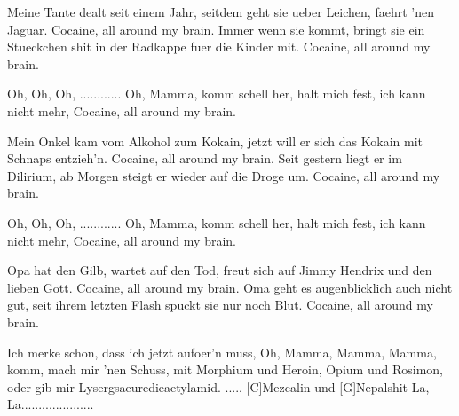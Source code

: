 \begin{guitar}
Meine Tante dealt seit einem Jahr,
seitdem geht sie ueber Leichen, faehrt  'nen Jaguar.
Cocaine, all around my brain.
Immer wenn sie kommt, bringt sie ein Stueckchen shit
in der Radkappe fuer die Kinder mit.
Cocaine, all around my brain.



Oh,   Oh,    Oh, ............ Oh,  Mamma, komm schell her,
halt mich fest, ich kann nicht mehr,
Cocaine, all around my brain.



\pagebreak
Mein Onkel kam vom Alkohol zum Kokain,
jetzt will er sich das Kokain mit Schnaps entzieh'n.
Cocaine, all around my brain.
Seit gestern liegt er im Dilirium,
ab Morgen steigt er wieder auf die Droge um.
Cocaine, all around my brain.



Oh,   Oh,    Oh, ............ Oh,  Mamma, komm schell her,
halt mich fest, ich kann nicht mehr,
Cocaine, all around my brain.



Opa hat den Gilb, wartet auf den Tod,
freut sich auf Jimmy Hendrix und den lieben Gott.
Cocaine, all around my brain.
Oma geht es augenblicklich auch nicht gut,
seit ihrem letzten Flash spuckt sie nur noch Blut.
Cocaine, all around my brain.



Ich merke schon, dass ich jetzt aufoer'n muss,
Oh, Mamma, Mamma, Mamma, komm, mach mir 'nen Schuss,
mit Morphium und Heroin, Opium und Rosimon,
oder gib mir Lysergsaeuredieaetylamid.
..... [C]Mezcalin und [G]Nepalshit La, La.....................
\end{guitar}
